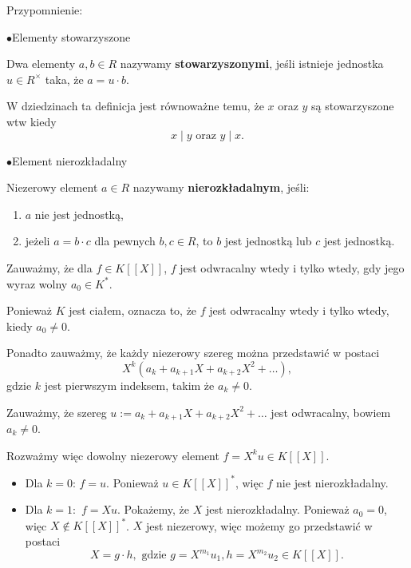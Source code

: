 \begin{solution}
	Przypomnienie:
	\begin{note}
	
	\noindent$\bullet$Elementy stowarzyszone

	Dwa elementy $a, b \in R$ nazywamy \textbf{stowarzyszonymi}, jeśli istnieje jednostka $u \in R^\times$ taka, że $a = u \cdot b$.

	W dziedzinach ta definicja jest równoważne temu, że $x$ oraz  $y$ są stowarzyszone wtw kiedy
	\[
	x \mid y \text{ oraz } y \mid x
	.\] 

	\noindent$\bullet$Element nierozkładalny

	Niezerowy element $a \in R$ nazywamy \textbf{nierozkładalnym}, jeśli:
	\begin{enumerate}[label=(\roman*)]
    		\item $a$ nie jest jednostką,
    		\item jeżeli $a = b \cdot c$ dla pewnych $b, c \in R$, to $b$ jest jednostką lub $c$ jest jednostką.
	\end{enumerate}

	\end{note}
	Zauważmy, że dla $f \in K\left[ \left[ X \right]  \right]$, $f$ jest odwracalny wtedy i tylko wtedy, gdy jego wyraz wolny $a_0 \in K^{\ast} $.

	Ponieważ $K$ jest ciałem, oznacza to, że $f$ jest odwracalny wtedy i tylko wtedy, kiedy $a_0 \neq 0$.

	Ponadto zauważmy, że każdy niezerowy szereg można przedstawić w postaci 
	\[
	X^{k}\left( a_{k} + a_{k+1}X + a_{k+2}X^{2} + \ldots\right) 
	,\]
	gdzie $k$ jest pierwszym indeksem, takim że $a_{k} \neq 0$.

	Zauważmy, że szereg $u := a_{k} + a_{k+1}X + a_{k+2}X^2 + \ldots$ jest odwracalny, bowiem $a_{k} \neq 0$.

	Rozważmy więc dowolny niezerowy element $f = X^{k}u \in K\left[ \left[ X \right]  \right] $.
	\begin{itemize}
		\item Dla $k = 0$:  $f = u$. Ponieważ  $u \in K\left[ \left[ X \right]  \right]^{\ast} $, więc $f$ nie jest nierozkładalny.
		\item Dla $k=1:$  $f = Xu$. Pokażemy, że $X$ jest nierozkładalny. Ponieważ  $a_{0} = 0$, więc $X \not\in K\left[ \left[ X \right]  \right]^{\ast} $. $X$ jest niezerowy, więc możemy go przedstawić w postaci
			\[
			X = g\cdot h, \text{ gdzie } g = X^{m_1}u_1, h = X^{m_2}u_2 \in K\left[ \left[ X \right]  \right]  
			.\] 


\end{itemize}
\end{solution}
